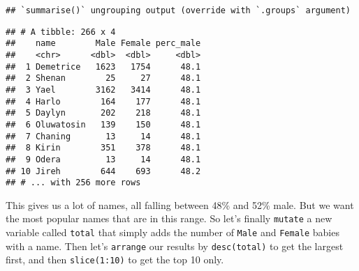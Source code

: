 \documentclass[
]{article}
\newenvironment{Shaded}{\begin{snugshade}}{\end{snugshade}}
\newcommand{\DataTypeTok}[1]{\textcolor[rgb]{0.13,0.29,0.53}{#1}}
\newcommand{\DecValTok}[1]{\textcolor[rgb]{0.00,0.00,0.81}{#1}}
\newcommand{\KeywordTok}[1]{\textcolor[rgb]{0.13,0.29,0.53}{\textbf{#1}}}
\newcommand{\NormalTok}[1]{#1}
\newcommand{\OperatorTok}[1]{\textcolor[rgb]{0.81,0.36,0.00}{\textbf{#1}}}
\newcommand{\StringTok}[1]{\textcolor[rgb]{0.31,0.60,0.02}{#1}}
\begin{document}
\begin{Shaded}
\end{Shaded}

\begin{verbatim}
## `summarise()` ungrouping output (override with `.groups` argument)
\end{verbatim}

\begin{verbatim}
## # A tibble: 266 x 4
##    name        Male Female perc_male
##    <chr>      <dbl>  <dbl>     <dbl>
##  1 Demetrice   1623   1754      48.1
##  2 Shenan        25     27      48.1
##  3 Yael        3162   3414      48.1
##  4 Harlo        164    177      48.1
##  5 Daylyn       202    218      48.1
##  6 Oluwatosin   139    150      48.1
##  7 Chaning       13     14      48.1
##  8 Kirin        351    378      48.1
##  9 Odera         13     14      48.1
## 10 Jireh        644    693      48.2
## # ... with 256 more rows
\end{verbatim}

This gives us a lot of names, all falling between 48\% and 52\% male.
But we want the most popular names that are in this range. So let's
finally \texttt{mutate} a new variable called \texttt{total} that simply
adds the number of \texttt{Male} and \texttt{Female} babies with a name.
Then let's \texttt{arrange} our results by \texttt{desc(total)} to get
the largest first, and then \texttt{slice(1:10)} to get the top 10 only.
\end{document}
